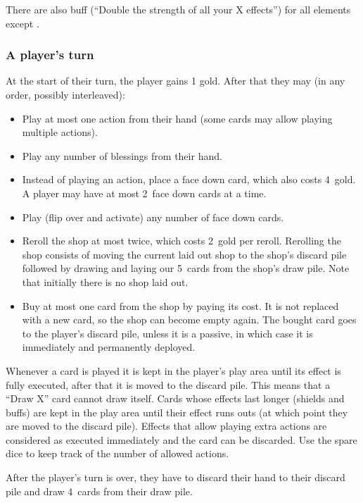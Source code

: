 \documentclass[dvipsnames,parskip,a4paper]{scrartcl}
\newcommand{\iconsize}{3.4mm}
\newcommand{\icondepth}{0.45mm}
\newcommand{\icon}[1]{\raisebox{-\icondepth}{\texttt{[image:  \#1 ]}}}
\newcommand{\chance}{\icon{icons/chance.png}}
\newcommand{\rerollcost}{2}
\newcommand{\facedowncost}{4}
\newcommand{\handsize}{4}
\newcommand{\dacedownsize}{2}
\newcommand{\shopsize}{5}
\begin{document}
There are also buff (``Double the strength of all your X effects'') for all elements except \chance.

\subsubsection*{A player's turn}

At the start of their turn, the player gains 1 gold. After that they may (in any order, possibly interleaved):

\begin{itemize}
\item Play at most one action from their hand (some cards may allow playing multiple actions).
\item Play any number of blessings from their hand.
\item Instead of playing an action, place a face down card, which also costs \facedowncost \ gold. A player may have at most \dacedownsize \ face down cards at a time.
\item Play (flip over and activate) any number of face down cards.
\item Reroll the shop at most twice, which costs \rerollcost \ gold per reroll.
Rerolling the shop consists of moving the current laid out shop to the shop's discard pile followed by drawing and laying our \shopsize \ cards from the shop's draw pile. Note that initially there is no shop laid out.
\item Buy at most one card from the shop by paying its cost. It is not replaced with a new card, so the shop can become empty again. The bought card goes to the player's discard pile, unless it is a passive, in which case it is immediately and permanently deployed.
\end{itemize}

Whenever a card is played it is kept in the player's play area until its effect is fully executed, after that it is moved to the discard pile. This means that a ``Draw X'' card cannot draw itself. Cards whose effects last longer (shields and buffs) are kept in the play area until their effect runs outs (at which point they are moved to the discard pile). Effects that allow playing extra actions are considered as executed immediately and the card can be discarded. Use the spare dice to keep track of the number of allowed actions.

After the player's turn is over, they have to discard their hand to their discard pile and draw \handsize \ cards from their draw pile. 
\end{document}
